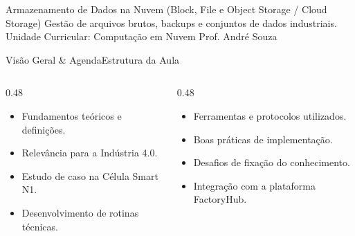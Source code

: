 
\senaicover
  {Armazenamento de Dados na Nuvem (Block, File e Object Storage / Cloud Storage)}
  {Gestão de arquivos brutos, backups e conjuntos de dados industriais.}
  {Unidade Curricular: Computação em Nuvem}
  {Prof. André Souza}

\begin{senaiframe}{Visão Geral \& Agenda}{Estrutura da Aula}
  \begin{columns}[t]
    \begin{column}{0.48\textwidth}
      \begin{tcolorbox}[senaibluecard, title={1. Conceitos Chave}]
        \begin{itemize}
          \item Fundamentos teóricos e definições.
          \item Relevância para a Indústria 4.0.
        \end{itemize}
      \end{tcolorbox}
      \vspace{4pt}
      \begin{tcolorbox}[senaiambercard, title={3. Aplicação Prática}]
        \begin{itemize}
          \item Estudo de caso na Célula Smart N1.
          \item Desenvolvimento de rotinas técnicas.
        \end{itemize}
      \end{tcolorbox}
    \end{column}
    \begin{column}{0.48\textwidth}
      \begin{tcolorbox}[senairedcard, title={2. Detalhamento Técnico}]
        \begin{itemize}
          \item Ferramentas e protocolos utilizados.
          \item Boas práticas de implementação.
        \end{itemize}
      \end{tcolorbox}
      \vspace{4pt}
      \begin{tcolorbox}[senaigreencard, title={4. Exercícios \& Avaliação}]
        \begin{itemize}
          \item Desafios de fixação do conhecimento.
          \item Integração com a plataforma FactoryHub.
        \end{itemize}
      \end{tcolorbox}
    \end{column}
  \end{columns}
\end{senaiframe}

